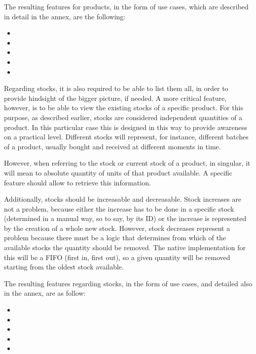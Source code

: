 The resulting features for products, in the form of use cases, which are described in detail in the annex, are the following:

\begin{itemize}
\item {}
\item {}
\item {}
\item {}
\item {}
\end{itemize}

Regarding stocks, it is also required to be able to list them all, in order to provide hindsight of the bigger picture, if needed. A more critical feature, however, is to be able to view the existing stocks of a specific product. For this purpose, as described earlier, stocks are considered independent quantities of a product. In this particular case this is designed in this way to provide awareness on a practical level. Different stocks will represent, for instance, different batches of a product, usually bought and received at different moments in time.

However, when referring to the stock or current stock of a product, in singular, it will mean to absolute quantity of units of that product available. A specific feature should allow to retrieve this information.

Additionally, stocks should be increasable and decreasable. Stock increases are not a problem, because either the increase has to be done in a specific stock (determined in a manual way, so to say, by its ID) or the increase is represented by the creation of a whole new stock. However, stock decreases represent a problem because there must be a logic that determines from which of the available stocks the quantity should be removed. The native implementation for this will be a FIFO (first in, first out), so a given quantity will be removed starting from the oldest stock available.

The resulting features regarding stocks, in the form of use cases, and detailed also in the annex, are as follow:

\begin{itemize}
\item {}
\item {}
\item {}
\item {}
\item {}
\end{itemize}

